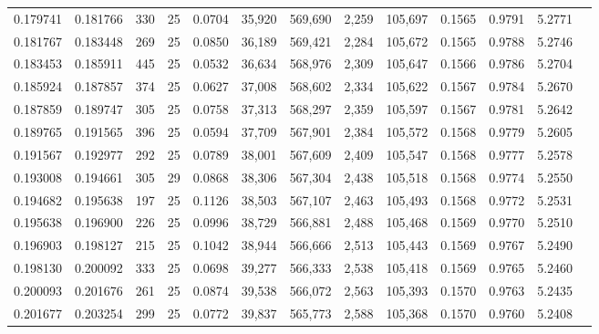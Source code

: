\begin{tabular}{rrrrrrrrrrrrr}
0.179741 & 0.181766 &   330 &  25 &                                     0.0704 &  35,920 & 569,690 &   2,259 & 105,697 & 0.1565 & 0.9791 & 5.2771 \\
0.181767 & 0.183448 &   269 &  25 &                                     0.0850 &  36,189 & 569,421 &   2,284 & 105,672 & 0.1565 & 0.9788 & 5.2746 \\
0.183453 & 0.185911 &   445 &  25 &                                     0.0532 &  36,634 & 568,976 &   2,309 & 105,647 & 0.1566 & 0.9786 & 5.2704 \\
0.185924 & 0.187857 &   374 &  25 &                                     0.0627 &  37,008 & 568,602 &   2,334 & 105,622 & 0.1567 & 0.9784 & 5.2670 \\
0.187859 & 0.189747 &   305 &  25 &                                     0.0758 &  37,313 & 568,297 &   2,359 & 105,597 & 0.1567 & 0.9781 & 5.2642 \\
0.189765 & 0.191565 &   396 &  25 &                                     0.0594 &  37,709 & 567,901 &   2,384 & 105,572 & 0.1568 & 0.9779 & 5.2605 \\
0.191567 & 0.192977 &   292 &  25 &                                     0.0789 &  38,001 & 567,609 &   2,409 & 105,547 & 0.1568 & 0.9777 & 5.2578 \\
0.193008 & 0.194661 &   305 &  29 &                                     0.0868 &  38,306 & 567,304 &   2,438 & 105,518 & 0.1568 & 0.9774 & 5.2550 \\
0.194682 & 0.195638 &   197 &  25 &                                     0.1126 &  38,503 & 567,107 &   2,463 & 105,493 & 0.1568 & 0.9772 & 5.2531 \\
0.195638 & 0.196900 &   226 &  25 &                                     0.0996 &  38,729 & 566,881 &   2,488 & 105,468 & 0.1569 & 0.9770 & 5.2510 \\
0.196903 & 0.198127 &   215 &  25 &                                     0.1042 &  38,944 & 566,666 &   2,513 & 105,443 & 0.1569 & 0.9767 & 5.2490 \\
0.198130 & 0.200092 &   333 &  25 &                                     0.0698 &  39,277 & 566,333 &   2,538 & 105,418 & 0.1569 & 0.9765 & 5.2460 \\
0.200093 & 0.201676 &   261 &  25 &                                     0.0874 &  39,538 & 566,072 &   2,563 & 105,393 & 0.1570 & 0.9763 & 5.2435 \\
0.201677 & 0.203254 &   299 &  25 &                                     0.0772 &  39,837 & 565,773 &   2,588 & 105,368 & 0.1570 & 0.9760 & 5.2408 \\

\end{tabular}
